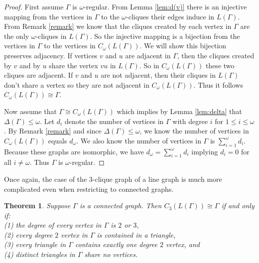 \documentclass[12pt]{report}
\newtheorem{thm}{Theorem}[chapter]
\theoremstyle{definition}
\begin{document}
\begin{proof}
    First assume $\Gamma$ is $\omega$-regular. From Lemma \ref{lem:d(v)} there is an injective mapping from the vertices in $\Gamma$ to the $\omega$-cliques their edges induce in $L(\Gamma)$. From Remark \ref{remark} we know that the cliques created by each vertex in $\Gamma$ are the only $\omega$-cliques in $L(\Gamma)$. So the injective mapping is a bijection from the vertices in $\Gamma$ to the vertices in $C_\omega(L(\Gamma))$. We will show this bijection preserves adjacency. If vertices $v$ and $u$ are adjacent in $\Gamma$, then the cliques created by $v$ and by $u$ share the vertex $vu$ in $L(\Gamma)$. So in $C_\omega(L(\Gamma))$ these two cliques are adjacent. If $v$ and $u$ are not adjacent, then their cliques in $L(\Gamma)$ don't share a vertex so they are not adjacent in $C_\omega(L(\Gamma))$. Thus it follows $C_\omega(L(\Gamma)) \cong \Gamma$.\par
    Now assume that $\Gamma \cong C_\omega(L(\Gamma))$ which implies by Lemma \ref{lem:delta} that $\Delta(\Gamma)\leq \omega$. Let $d_i$ denote the number of vertices in $\Gamma$ with degree $i$ for $1 \leq i \leq \omega$. By Remark \ref{remark} and since $\Delta(\Gamma) \leq \omega$, we know the number of vertices in $C_\omega(L(\Gamma))$ equals $d_\omega$. We also know the number of vertices in $\Gamma$ is $\sum_{i=1}^\omega d_i$. Because these graphs are isomorphic, we have $d_\omega = \sum_{i=1}^\omega d_i$ implying $d_i = 0$ for all $i\neq \omega$. Thus $\Gamma$ is $\omega$-regular.
\end{proof}
Once again, the case of the $3$-clique graph of a line graph is much more complicated even when restricting to connected graphs.
\clearpage
\begin{thm} \label{thm:3ci}
    Suppose $\Gamma$ is a connected graph. Then $C_3(L(\Gamma)) \cong \Gamma$ if and only if:\\
           \hspace*{0.5cm} (1) the degree of every vertex in $\Gamma$ is $2$ or $3$,  \\
           \hspace*{0.5cm} (2) every degree $2$ vertex in $\Gamma$ is contained in a triangle, \\
           \hspace*{0.5cm} (3) every triangle in $\Gamma$ contains exactly one degree $2$ vertex, and \\
           \hspace*{0.5cm} (4) distinct triangles in $\Gamma$ share no vertices.\vspace{0.2cm} 
\end{thm}
\end{document}
